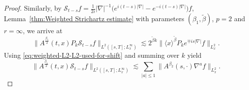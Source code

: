 \documentclass[11pt,twoside]{article}
\theoremstyle{plain}
\theoremstyle{definition}
\theoremstyle{assumption}
\numberwithin{equation}{section}
\begin{document}
\begin{proof}
		Similarly, by
		$\mathcal S_{t-s}f
		=\frac{1}{2i}|\nabla|^{-1}
		\big(e^{i(t-s)|\nabla|}
		-e^{-i(t-s)|\nabla|}
		\big)f$, Lemma~\ref{thm:Weighted Strichartz estimate} with parameters
		\((\beta_1,\widetilde\beta)\), \(p=2\) and \(r=\infty\), we arrive at
		\[
		\big\|
		A^{\frac{\beta_1}{2}}(t,x)
		P_k\mathcal S_{t-s}f
		\big\|_{L^2([s,T];L^\infty_x)}
		\lesssim
		2^{\widetilde\beta k}
		\big\|
		\langle x\rangle^{\widetilde\beta}
		P_{k}e^{\mp is|\nabla|}f
		\big\|_{L^2_x}.
		\]
		Using \eqref{eq:weighted-L2-L2-used-for-shift} and summing over \(k\) yield
		\begin{equation}
			\label{eq:shifted-S-L2t-Linfty}
			\big\|
			A^{\frac{\beta_1}{2}}(t,x)
			\mathcal S_{t-s}f
			\big\|_{L^2([s,T];L^\infty_x)}
			\lesssim
			\sum_{|a|\le1}
			\big\|
			A^{\beta_2}(s,\cdot)\nabla^a f
			\big\|_{L^2_x}.
		\end{equation}
		

\end{proof}
\end{document}
